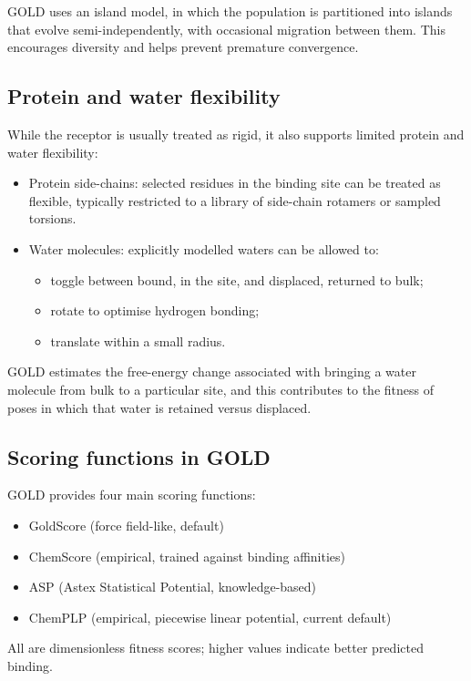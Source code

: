 \documentclass[12pt]{article}
\begin{document}
GOLD uses an island model, in which the population is partitioned into islands that evolve semi-independently, with occasional migration between them. This encourages diversity and helps prevent premature convergence\cite{CH7_Jones1997}.

\subsection{Protein and water flexibility}
While the receptor is usually treated as rigid, it also supports limited protein and water flexibility:
\begin{itemize}
    \item Protein side-chains: selected residues in the binding site can be treated as flexible, typically restricted to a library of side-chain rotamers or sampled torsions.
    \item Water molecules: explicitly modelled waters can be allowed to:
    \begin{itemize}
        \item toggle between bound, in the site, and displaced, returned to bulk;
        \item rotate to optimise hydrogen bonding;
        \item translate within a small radius.
    \end{itemize}
\end{itemize}
GOLD estimates the free-energy change associated with bringing a water molecule from bulk to a particular site, and this contributes to the fitness of poses in which that water is retained versus displaced.

\subsection{Scoring functions in GOLD}

GOLD provides four main scoring functions:
\begin{itemize}
    \item GoldScore (force field-like, default)
    \item ChemScore (empirical, trained against binding affinities)
    \item ASP (Astex Statistical Potential, knowledge-based)\cite{CH7_Mooij2005}
    \item ChemPLP (empirical, piecewise linear potential, current default)
\end{itemize}
All are dimensionless fitness scores; higher values indicate better predicted binding.
\end{document}
